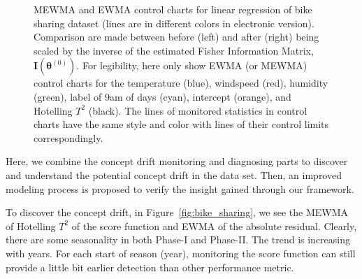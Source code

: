 \documentclass[twoside,11pt]{article}
\begin{document}
\begin{figure}[!htbp]
  \caption{
  MEWMA and EWMA control charts for linear regression of bike sharing dataset (lines are in different colors in electronic version). Comparison are made between before (left) and after (right) being scaled by the inverse of the estimated Fisher Information Matrix, $\mathbf {I} ( {\bm{\theta}} ^{(0)})$. For legibility, here only show EWMA (or MEWMA) control charts for the temperature (blue), windspeed (red), humidity (green), label of $9$am of days (cyan), intercept (orange), and Hotelling $T^2$ (black). The lines of monitored statistics in control charts have the same style and color with lines of their control limits correspondingly.
}
\label{fig:bike_sharing_diag}
\end{figure}

Here, we combine the concept drift monitoring and diagnosing parts to discover and understand the potential concept drift in the data set. Then, an improved modeling process is proposed to verify the insight gained through our framework.

To discover the concept drift, in Figure~\ref{fig:bike_sharing}, we see the MEWMA of Hotelling $T^2$ of the score function and EWMA of the absolute residual. Clearly, there are some seasonality in both Phase-I and Phase-II. The trend is increasing with years. For each start of season (year), monitoring the score function can still provide a little bit earlier detection than other performance metric. 
\end{document}
